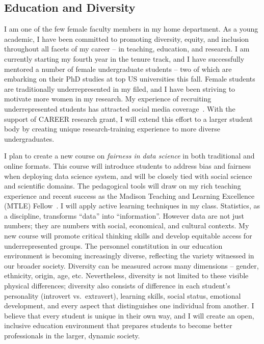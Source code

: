 \documentclass[11pt]{article}
\theoremstyle{exampstyle}
\theoremstyle{definition}
\begin{document}
  \vspace{-.42cm}
\subsection{Education and Diversity}
  \vspace{-.3cm}
I am one of the few female faculty members in my home department. As a young academic, I have been committed to promoting diversity, equity, and inclusion throughout all facets of my career -- in teaching, education, and research. I am currently starting my fourth year in the tenure track, and I have successfully mentored a number of female undergraduate students -- two of which are embarking on their PhD studies at top US universities this fall. Female students are traditionally underrepresented in my filed, and I have been striving to motivate more women in my research. My experience of recruiting underrepresented students has attracted social media coverage~\cite{wang11}. With the support of CAREER research grant, I will extend this effort to a larger student body by creating unique research-training experience to more diverse undergraduates. 

I plan to create a new course on \emph{fairness in data science} in both traditional and online formats. This course will introduce students to address bias and fairness when deploying data science system, and will be closely tied with social science and scientific domains. The pedagogical tools will draw on my rich teaching experience and recent success as the Madison Teaching and Learning Excellence (MTLE) Fellow~\cite{wang12}. I will apply active learning techniques in my class. Statistics, as a discipline, transforms ``data'' into ``information''. However data are not just numbers; they are numbers with social, economical, and cultural contexts. My new course will promote critical thinking skills and develop equitable access for underrepresented groups. The personnel constitution in our education environment is becoming increasingly diverse, reflecting the variety witnessed in our broader society. Diversity can be measured across many dimensions -- gender, ethnicity, origin, age, etc. Nevertheless, diversity is not limited to these visible physical differences; diversity also consists of difference in each student’s personality (introvert vs.\ extravert), learning skills, social status, emotional development, and every aspect that distinguishes one individual from another. I believe that every student is unique in their own way, and I will create an open, inclusive education environment that prepares students to become better professionals in the larger, dynamic society.
\end{document}
